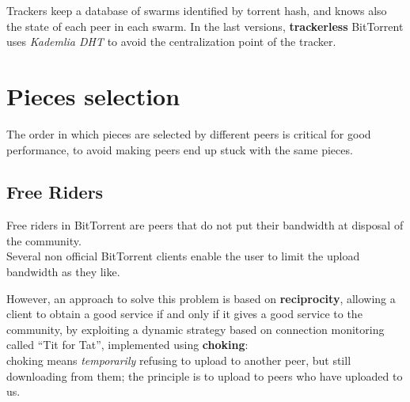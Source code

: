 Trackers keep a database of swarms identified by torrent hash, and knows also the state of each peer in each swarm.
In the last versions, \textbf{trackerless} BitTorrent uses \textit{Kademlia DHT} to avoid the centralization point of the tracker.

\section{Pieces selection}
The order in which pieces are selected by different peers is critical for good performance, to avoid making peers end up stuck with the same pieces.

\subsection{Free Riders}
Free riders in BitTorrent are peers that do not put their bandwidth at disposal of the community.\\
Several non official BitTorrent clients enable the user to limit the upload bandwidth as they like.

However, an approach to solve this problem is based on \textbf{reciprocity}, allowing a client to obtain a good service if and only if it gives a good service to the community, by exploiting a dynamic strategy based on connection monitoring called ``Tit for Tat'', implemented using \textbf{choking}:\\
choking means \textit{temporarily} refusing to upload to another peer, but still downloading from them;  
the principle is to upload to peers who have uploaded to us.

